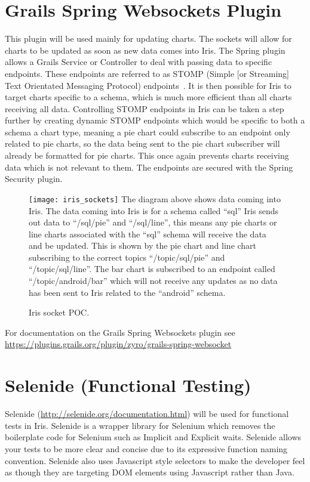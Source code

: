 \documentclass[12pt,a4paper,titlepage]{report}
\newcommand{\q}[1]{``#1''}
\begin{document}
\section{Grails Spring Websockets Plugin}

This plugin will be used mainly for updating charts. The sockets will allow for charts to be updated as soon as new data comes into Iris. The Spring plugin allows a Grails Service or Controller to deal with passing data to specific endpoints. These endpoints are referred to as STOMP (Simple [or Streaming] Text Orientated Messaging Protocol) endpoints~\parencite{Docs.spring.io}. It is then possible for Iris to target charts specific to a schema, which is much more efficient than all charts receiving all data. Controlling STOMP endpoints in Iris can be taken a step further by creating dynamic STOMP endpoints which would be specific to both a schema a chart type, meaning a pie chart could subscribe to an endpoint only related to pie charts, so the data being sent to the pie chart subscriber will already be formatted for pie charts. This once again prevents charts receiving data which is not relevant to them. The endpoints are secured with the Spring Security plugin.
\begin{figure}[H]
\begin{tcolorbox}
\texttt{[image: iris\_sockets]}
\newline
The diagram above shows data coming into Iris. The data coming into Iris is for a schema called \q{sql} Iris sends out data to \q{/sql/pie} and \q{/sql/line}, this means any pie charts or line charts associated with the \q{sql} schema will receive the data and be updated. This is shown by the pie chart and line chart subscribing to the correct topics \q{/topic/sql/pie} and \q{/topic/sql/line}. The bar chart is subscribed to an endpoint called \q{/topic/android/bar} which will not receive any updates as no data has been sent to Iris related to the \q{android} schema.
\end{tcolorbox}
\caption{Iris socket POC.}
\end{figure}
For documentation on the Grails Spring Websockets plugin see \url{https://plugins.grails.org/plugin/zyro/grails-spring-websocket}

\section{Selenide (Functional Testing)}

Selenide (\url{http://selenide.org/documentation.html}) will be used for functional tests in Iris. Selenide is a wrapper library for Selenium which removes the boilerplate code for Selenium such as Implicit and Explicit waits. Selenide allows your tests to be more clear and concise due to its expressive function naming convention. Selenide also uses Javascript style selectors to make the developer feel as though they are targeting DOM elements using Javascript rather than Java.
\end{document}

